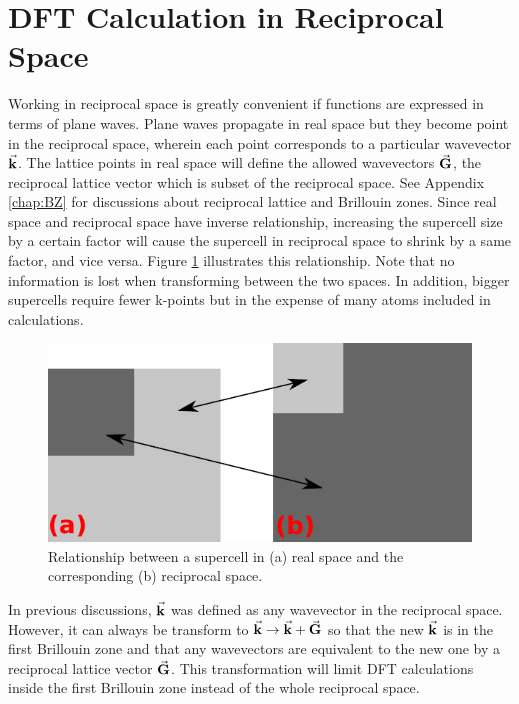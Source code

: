 \section{DFT Calculation in Reciprocal Space}
Working in reciprocal space is greatly convenient if functions are expressed in terms of plane waves. Plane waves propagate in real space but they become point in the reciprocal space, wherein each point corresponds to a particular wavevector $\va{k}$. The lattice points in real space will define the allowed wavevectors $ \va{G}$, the reciprocal lattice vector which is subset of the reciprocal space. See Appendix \ref{chap:BZ} for discussions about reciprocal lattice and Brillouin zones. Since real space and reciprocal space have inverse relationship, increasing the supercell size by a certain factor will cause the supercell in reciprocal space to shrink by  a same factor, and vice versa. Figure \ref{fig:reciprocal} illustrates this relationship. Note that no information is lost when transforming between the two spaces. In addition, bigger supercells require fewer k-points but in the expense of many atoms included in calculations.
\begin{figure}[tbh!]
    \centering
    \includegraphics[width=0.5\linewidth]{"images/computational/reciprocal"}
    \caption[Relationship between a supercell in real space and reciprocal space]{Relationship between a supercell in (a) real space and the corresponding (b) reciprocal space.}
    \label{fig:reciprocal}
\end{figure}

In previous discussions,  $\va{k}$ was defined as any wavevector in the reciprocal space. However, it can always be transform to $\va{k} \rightarrow \va{k} + \va{G} $ so that the new $\va{k}$ is in the first Brillouin zone and that any wavevectors are equivalent to the new one by a reciprocal lattice vector $\va{G}$.  This transformation will limit DFT calculations inside the first Brillouin zone instead of the whole reciprocal space. 

